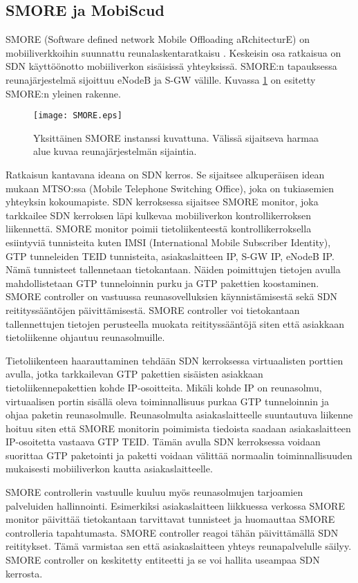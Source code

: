 
\subsection{SMORE ja MobiScud} \label{smore}
SMORE (Software defined network Mobile Offloading aRchitecturE) on mobiiliverkkoihin suunnattu reunalaskentaratkaisu \cite{cho2014smore}.
Keskeisin osa ratkaisua on SDN käyttöönotto mobiiliverkon sisäisissä yhteyksissä.
SMORE:n tapauksessa reunajärjestelmä sijoittuu eNodeB ja S-GW välille. Kuvassa \ref{fig:smore} on esitetty SMORE:n yleinen rakenne.

\begin{figure}[tb]
\texttt{[image: SMORE.eps]}
\caption{Yksittäinen SMORE instanssi kuvattuna. Välissä sijaitseva harmaa alue kuvaa reunajärjestelmän sijaintia.} \label{fig:smore}
\end{figure}


Ratkaisun kantavana ideana on SDN kerros. Se sijaitsee alkuperäisen idean mukaan MTSO:ssa (Mobile Telephone Switching Office), joka on tukiasemien yhteyksin kokoumapiste.
SDN kerroksessa sijaitsee SMORE monitor, joka tarkkailee SDN kerroksen läpi kulkevaa mobiiliverkon kontrollikerroksen liikennettä. SMORE monitor poimii tietoliikenteestä kontrollikerroksella esiintyviä tunnisteita kuten IMSI (International Mobile Subscriber Identity), GTP tunneleiden TEID tunnisteita, asiakaslaitteen IP, S-GW IP, eNodeB IP. Nämä tunnisteet tallennetaan tietokantaan.
Näiden poimittujen tietojen avulla mahdollistetaan GTP tunneloinnin purku ja GTP pakettien koostaminen.
SMORE controller on vastuussa reunasovelluksien käynnistämisestä sekä SDN reitityssääntöjen päivittämisestä. SMORE controller voi tietokantaan tallennettujen tietojen perusteella muokata reitityssääntöjä siten että asiakkaan tietoliikenne ohjautuu reunasolmuille. 

Tietoliikenteen haarauttaminen tehdään SDN kerroksessa virtuaalisten porttien avulla, jotka tarkkailevan GTP pakettien sisäisten asiakkaan tietoliikennepakettien kohde IP-osoitteita. Mikäli kohde IP on reunasolmu, virtuaalisen portin sisällä oleva toiminnallisuus purkaa GTP tunneloinnin ja ohjaa paketin reunasolmulle. Reunasolmulta asiakaslaitteelle suuntautuva liikenne hoituu siten että SMORE monitorin poimimista tiedoista saadaan asiakaslaitteen IP-osoitetta vastaava GTP TEID.
Tämän avulla SDN kerroksessa voidaan suorittaa GTP paketointi ja paketti voidaan välittää normaalin toiminnallisuuden mukaisesti mobiiliverkon kautta asiakaslaitteelle. 

SMORE controllerin vastuulle kuuluu myös reunasolmujen tarjoamien palveluiden hallinnointi. 
Esimerkiksi asiakaslaitteen liikkuessa verkossa SMORE monitor päivittää tietokantaan tarvittavat tunnisteet ja huomauttaa SMORE controlleria tapahtumasta. SMORE controller reagoi tähän päivittämällä SDN reititykset. Tämä varmistaa sen että asiakaslaitteen yhteys reunapalvelulle säilyy. SMORE controller on keskitetty entiteetti ja se voi hallita useampaa SDN kerrosta.

